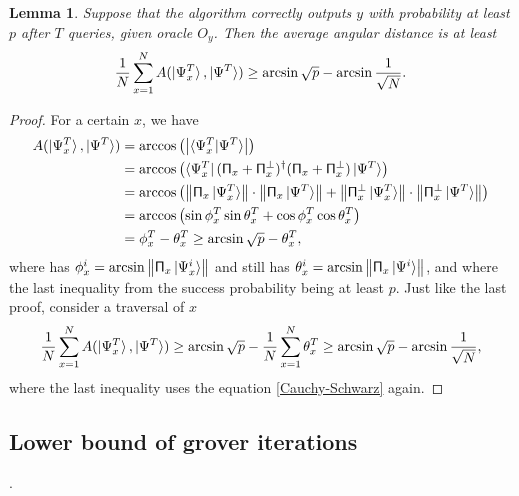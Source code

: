 \documentclass[a4paper,10pt]{article}
\newtheorem{lemma}{Lemma}[subsection]
\numberwithin{equation}{subsection}
\begin{document}
\begin{lemma}
    Suppose that the algorithm correctly outputs $y$ with probability at least $p$ after $T$ queries, given oracle $O_{y}$. Then the average angular distance is at least
    \begin{equation}
        \frac{1}{N}\sum_{x=1}^{N}A(\ket{\Psi_{x}^{T}},\ket{\Psi^{T}})\geq \arcsin\sqrt{p}-\arcsin\frac{1}{\sqrt{N}}.
    \end{equation}
\end{lemma}
\begin{proof}
    For a certain $x$, we have
    \begin{equation*}
        \begin{split}
            A(\ket{\Psi_{x}^{T}},\ket{\Psi^{T}})
             & = \arccos\left(\left\lvert \braket{\Psi_{x}^{T}|\Psi^{T}}\right\rvert\right)                                                                                                                                                                  \\
             & = \arccos\left(\bra{\Psi_{x}^{T}}(\mathsf{\Pi}_{x}+\mathsf{\Pi}_{x}^{\perp})^{\dagger}(\mathsf{\Pi}_{x}+\mathsf{\Pi}_{x}^{\perp})\ket{\Psi^{T}}\right)                                                                                        \\
             & = \arccos\left(\left\|\mathsf{\Pi}_{x}\ket{\Psi_{x}^{T}}\right\|\cdot\left\|\mathsf{\Pi}_{x}\ket{\Psi^{T}}\right\|+\left\|\mathsf{\Pi}_{x}^{\perp}\ket{\Psi_{x}^{T}}\right\|\cdot\left\|\mathsf{\Pi}_{x}^{\perp}\ket{\Psi^{T}}\right\|\right) \\
             & = \arccos\left(\sin\phi_{x}^{T}\sin\theta_{x}^{T}+\cos\phi_{x}^{T}\cos\theta_{x}^{T}\right)                                                                                                                                                   \\
             & = \phi_{x}^{T}-\theta_{x}^{T} \geq \arcsin\sqrt{p}-\theta_{x}^{T},
        \end{split}
    \end{equation*}
    where has $\phi_{x}^{i}=\arcsin\left\| \mathsf{\Pi}_{x}\ket{\Psi_{x}^{i}}\right\|$ and still has $\theta_{x}^{i}=\arcsin\left\| \mathsf{\Pi}_{x}\ket{\Psi^{i}}\right\|$, and where the last inequality from the success probability being at least $p$. Just like the last proof, consider a traversal of $x$
    \begin{equation*}
        \frac{1}{N}\sum_{x=1}^{N}A(\ket{\Psi_{x}^{T}},\ket{\Psi^{T}})
        \geq \arcsin\sqrt{p}-\frac{1}{N}\sum_{x=1}^{N}\theta_{x}^{T}
        \geq \arcsin\sqrt{p}-\arcsin\frac{1}{\sqrt{N}},
    \end{equation*}
    where the last inequality uses the equation \ref{Cauchy-Schwarz} again.
\end{proof}



\subsection{Lower bound of grover iterations}



.




\end{document}
